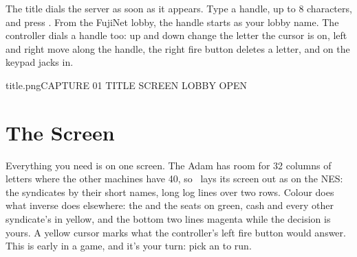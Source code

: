 \documentclass[12pt,letterpaper]{article}
\begin{document}
The title dials the server as soon as it appears. Type a handle, up to 8 characters, and press . From
the FujiNet lobby, the handle starts as your lobby name. The controller dials a handle too: up and down change the
letter the cursor is on, left and right move along the handle, the right fire button deletes a letter, and
\key{\#} on the keypad jacks in.

\begin{capture}{title.png}{CAPTURE 01 \quad TITLE SCREEN \quad LOBBY OPEN}
\end{capture}

\begin{legend}
\end{legend}

\renewcommand{\secstatus}{32 COLUMNS \quad // \quad COLOUR \quad // \quad THE CURSOR}
\chapter{The Screen}
\begin{sloppypar}
Everything you need is on one screen. The Adam has room for 32 columns of letters where the other machines have
40, so \game\ lays its screen out as on the NES: the syndicates by their short names, long log lines over two
rows. Colour does what inverse does elsewhere: the  and the seats on green, cash and every other
syndicate's  in yellow, and the bottom two lines magenta while the decision is yours. A yellow cursor marks
what the controller's left fire button would answer. This is early in a game, and it's your turn: pick an
 to run.
\end{sloppypar}
\end{document}
